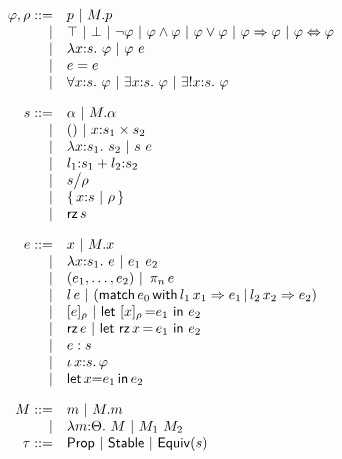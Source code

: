 \begin{figure}
	\[
	\begin{array}{rll}
		\ip,\ipp ::= 
		    & \iP\ |\ \iselect{\im}{\iP}\\
		  | & \itrue \ | \ \ifalse\ |\ \inot{\ip}\ |\ \iand{\ip}{\ip}\ |\ 
		       \ior{\ip}{\ip}\ | \ \iimply{\ip}{\ip}\ |\ \iiff{\ip}{\ip}\\
		  | & \ilambda{\ix}{\is}{\ip} \ |\ \iapp{\ip}{\ie}\\
		  | & \iequal{\ie}{\ie}\\
		  | & \iforall{\ix}{\is}{\ip} \ |\ 
		      \iexists{\ix}{\is}{\ip} \ |\
		      \iunique{\ix}{\is}{\ip}\\[10pt]
		
		\is ::= 
		    & \iS \ |\ \iselect{\im}{\iS}\\
		  | & ()\ |\ \iprod{\ix}{\is_1}{\is_2}\\
		  | & \ilambda{\ix}{\is_1}{\is_2}\ |\ 
		      \iapp{\is}{\ie}\\
		  | & \isum{\il_1}{\is_1}{\il_2}{\is_2}\\
		  | & \iquot{\is}{\ipp}\\
		  | & \isubset{\ix}{\is}{\ipp}\\
		  | & \irz{\is}\\[10pt] 
		
	
		\ie ::=
		    & \ix\ |\ \iselect{\im}{\ix}\\
		  | & \ilambda{\ix}{\is_1}{\ie}\ |\ 
		      \iapp{\ie_1}{\ie_2}\\
		  | & \ituple{\ie_1}{\ie_2} 
		      \ibar \iproj{\ie}{n}\\
		  | & \iinj{\il}{\ie} 
		      \ibar (\imatch{\ie_0}{\il_1}{\ix_1}{\ie_1}{\il_2}{\ix_2}{\ie_2})\\
		  | & \ieclass{\ie}{\ipp}
		      \ibar \ileteclass{\ix}{\ipp}{\ie_1}{\ie_2}\\
		  | & \irz{\ie}
		      \ibar \iletrz{\ix}{\ie_1}{\ie_2}\\
		  | & \iconstrain{\ie}{\is}\\
		  | & \ithe{\ix}{\is}{\ip}\\
		  | & \ilet{\ix}{\ie_1}{\ie_2}\\[10pt]
		
		\im ::= 
		    & \iM \ |\ \iselect{\im}{\iM}\\
		  | & \ilambda{\iM}{\ith}{\im}\ |\ 
		      \iapp{\im_1}{\im_2}\\
		
		\ipt ::=
		    & \iProp\ |\ \iStable\ |\ \iEquiv{\is}\\[10pt] 
		

\end{array}\]
\end{figure}
